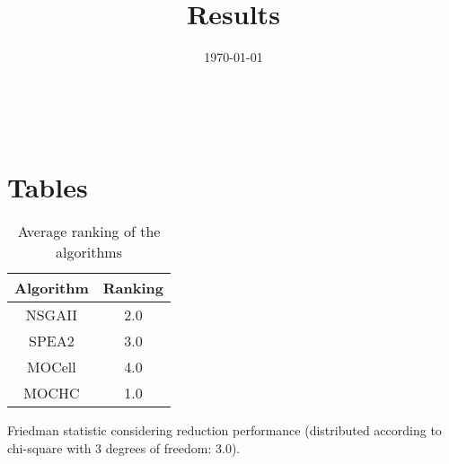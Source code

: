 \documentclass{article}
\title{Results}
\author{}
\date{\today}
\begin{document}
\oddsidemargin 0in \topmargin 0in\maketitle
\
\section{Tables}
\begin{table}[!htp]
\centering
\caption{Average ranking of the algorithms}
\begin{tabular}{c|c}
Algorithm&Ranking\\
\hline
NSGAII&2.0\\
SPEA2&3.0\\
MOCell&4.0\\
MOCHC&1.0\\
\end{tabular}
\end{table}


Friedman statistic considering reduction performance (distributed according to chi-square with 3 degrees of freedom: 3.0).
\end{document}
